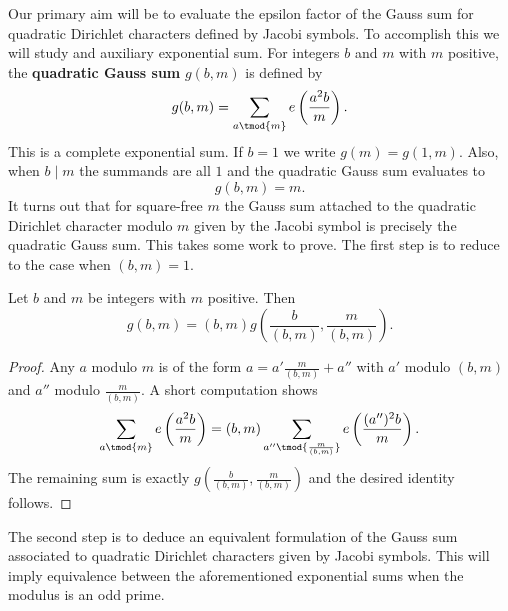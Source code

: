 \documentclass[12pt]{article}
\begin{document}
      Our primary aim will be to evaluate the epsilon factor of the Gauss sum for quadratic Dirichlet characters defined by Jacobi symbols. To accomplish this we will study and auxiliary exponential sum. For integers \(b\) and \(m\) with \(m\) positive, the \textbf{quadratic Gauss sum} \(g(b,m)\) is defined by
      \[
        g(b,m) = \sum_{a \tmod{m}}e\left(\frac{a^{2}b}{m}\right).
      \]
      This is a complete exponential sum. If \(b = 1\) we write \(g(m) = g(1,m)\). Also, when \(b \mid m\) the summands are all \(1\) and the quadratic Gauss sum evaluates to
      \[
        g(b,m) = m.
      \]
      It turns out that for square-free \(m\) the Gauss sum attached to the quadratic Dirichlet character modulo \(m\) given by the Jacobi symbol is precisely the quadratic Gauss sum. This takes some work to prove. The first step is to reduce to the case when \((b,m) = 1\).

      \begin{proposition}\label{prop:quadratic_Gauss_sum_relatively_prime_reduction}
        Let \(b\) and \(m\) be integers with \(m\) positive. Then
        \[
          g(b,m) = (b,m)g\left(\frac{b}{(b,m)},\frac{m}{(b,m)}\right).
        \]
      \end{proposition}
      \begin{proof}
        Any \(a\) modulo \(m\) is of the form \(a = a'\frac{m}{(b,m)}+a''\) with \(a'\) modulo \((b,m)\) and \(a''\) modulo \(\frac{m}{(b,m)}\). A short computation shows
        \[
          \sum_{a \tmod{m}}e\left(\frac{a^{2}b}{m}\right) = (b,m)\sum_{a'' \tmod{\frac{m}{(b,m)}}}e\left(\frac{(a'')^{2}b}{m}\right).
        \]
        The remaining sum is exactly \(g\left(\frac{b}{(b,m)},\frac{m}{(b,m)}\right)\) and the desired identity follows.
      \end{proof}

      The second step is to deduce an equivalent formulation of the Gauss sum associated to quadratic Dirichlet characters given by Jacobi symbols. This will imply equivalence between the aforementioned exponential sums when the modulus is an odd prime.
\end{document}

